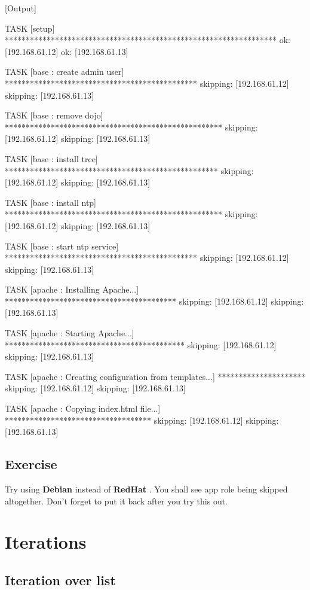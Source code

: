 [Output]\newline
\begin{code}
TASK [setup] *****************************************************************
ok: [192.168.61.12]
ok: [192.168.61.13]

TASK [base : create admin user] **********************************************
skipping: [192.168.61.12]
skipping: [192.168.61.13]

TASK [base : remove dojo] ****************************************************
skipping: [192.168.61.12]
skipping: [192.168.61.13]

TASK [base : install tree] ***************************************************
skipping: [192.168.61.12]
skipping: [192.168.61.13]

TASK [base : install ntp] ****************************************************
skipping: [192.168.61.12]
skipping: [192.168.61.13]

TASK [base : start ntp service] **********************************************
skipping: [192.168.61.12]
skipping: [192.168.61.13]

TASK [apache : Installing Apache...] *****************************************
skipping: [192.168.61.12]
skipping: [192.168.61.13]

TASK [apache : Starting Apache...] *******************************************
skipping: [192.168.61.12]
skipping: [192.168.61.13]

TASK [apache : Creating configuration from templates...] *********************
skipping: [192.168.61.12]
skipping: [192.168.61.13]

TASK [apache : Copying index.html file...] ***********************************
skipping: [192.168.61.12]
skipping: [192.168.61.13]
\end{code}

\subsection{Exercise}

Try using \textbf{Debian} instead of \textbf{RedHat} . You shall see app role being skipped altogether. Don't forget to put it back after you try this out.

\section{Iterations}

\subsection{Iteration over list}

